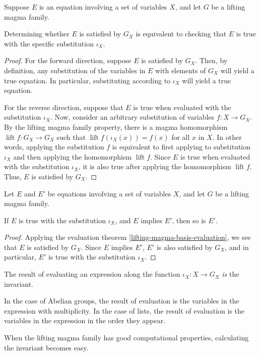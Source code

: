 \begin{theorem}\label{lifting-magma-basis-evaluation}
	Suppose $E$ is an equation involving a set of variables $X$, and let $G$ be a lifting magma family.

	Determining whether $E$ is satisfied by $G_X$ is equivalent to checking that $E$ is true with the specific substitution $\iota_X$.

\end{theorem}
\begin{proof}
	For the forward direction, suppose $E$ is satisfied by $G_X$. Then, by definition, any substitution of the variables in $E$ with elements of $G_X$ will yield a true equation. In particular, substituting according to $\iota_X$ will yield a true equation.

	For the reverse direction, suppose that $E$ is true when evaluated with the substitution $\iota_X$. Now, consider an arbitrary substitution of variables $f : X \to G_X$. By the lifting magma family property, there is a magma homomorphism $\operatorname{lift}{f} : G_X \to G_X$ such that $\operatorname{lift}{f}(\iota_X(x)) = f(x)$ for all $x$ in $X$. In other words, applying the substitution $f$ is equivalent to first applying to substitution $\iota_X$ and then applying the homomorphism $\operatorname{lift}{f}$. Since $E$ is true when evaluated with the substitution $\iota_X$, it is also true after applying the homomorphism $\operatorname{lift}{f}$. Thus, $E$ is satisfied by $G_X$.
\end{proof}

\begin{theorem}\label{fundamental-property-of-invariants}
	Let $E$ and $E'$ be equations involving a set of variables $X$, and let $G$ be a lifting magma family.

	If $E$ is true with the substitution $\iota_X$, and $E$ implies $E'$, then so is $E'$.
\end{theorem}
\begin{proof}
	Applying the evaluation theorem \ref{lifting-magma-basis-evaluation}, we see that $E$ is satisfied by $G_X$. Since $E$ implies $E'$, $E'$ is also satisfied by $G_X$, and in particular, $E'$ is true with the substitution $\iota_X$.
\end{proof}

\begin{remark}
	The result of evaluating an expression along the function $\iota_X : X \to G_X$ \emph{is} the invariant.

	In the case of Abelian groups, the result of evaluation is the variables in the expression with multiplicity.
	In the case of lists, the result of evaluation is the variables in the expression in the order they appear.

	When the lifting magma family has good computational properties, calculating the invariant becomes easy.
\end{remark}

